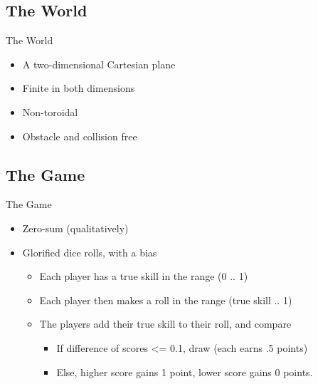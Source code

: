 \documentclass[12pt]{beamer}
\begin{document}
\subsection{The World}
\begin{frame}{The World}
  \begin{itemize}
    \item A two-dimensional Cartesian plane
    \item Finite in both dimensions
    \item Non-toroidal
    \item Obstacle and collision free
  \end{itemize}
\end{frame}

\subsection{The Game}
\begin{frame}{The Game}
  \begin{itemize}
    \item Zero-sum (qualitatively)
    \item Glorified dice rolls, with a bias
    \begin{itemize}
      \item Each player has a true skill in the range (0 .. 1)
      \item Each player then makes a roll in the range (true skill .. 1)
      \item The players add their true skill to their roll, and compare 
      \begin{itemize}
        \item If difference of scores <= 0.1, draw (each earns .5 points)
        \item Else, higher score gains 1 point, lower score gains 0 points.
      \end{itemize}
    \end{itemize}
  \end{itemize}
\end{frame}
\end{document}
